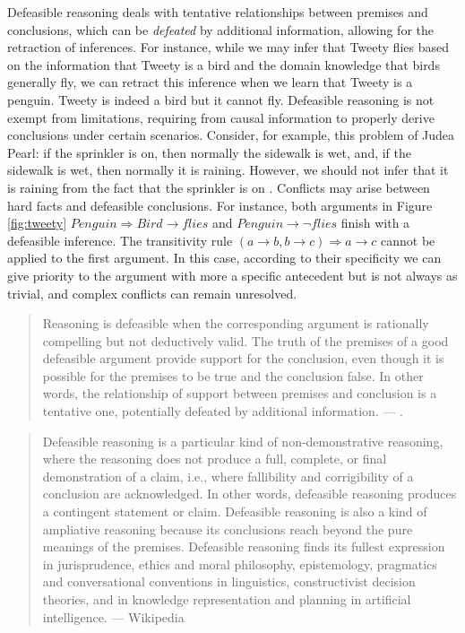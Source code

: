 \documentclass[
]{book}
\begin{document}
Defeasible reasoning deals with tentative relationships between premises and conclusions, which can be \emph{defeated} by additional information, allowing for the retraction of inferences. For instance, while we may infer that Tweety flies based on the information that Tweety is a bird and the domain knowledge that birds generally fly, we can retract this inference when we learn that Tweety is a penguin. Tweety is indeed a bird but it cannot fly. Defeasible reasoning is not exempt from limitations, requiring from causal information to properly derive conclusions under certain scenarios. Consider, for example, this problem of Judea Pearl: if the sprinkler is on, then normally the sidewalk is wet, and, if the sidewalk is wet, then normally it is raining. However, we should not infer that it is raining from the fact that the sprinkler is on \citep{pearl2014probabilistic}. Conflicts may arise between hard facts and defeasible conclusions. For instance, both arguments in Figure \ref{fig:tweety} \(Penguin ⇒ Bird → flies\) and \(Penguin → ¬flies\) finish with a defeasible inference. The transitivity rule \((a → b, b → c) ⇒ a → c\) cannot be applied to the first argument. In this case, according to their specificity we can give priority to the argument with more a specific antecedent but is not always as trivial, and complex conflicts can remain unresolved.

\begin{quote}
Reasoning is defeasible when the corresponding argument is rationally compelling but not deductively valid. The truth of the premises of a good defeasible argument provide support for the conclusion, even though it is possible for the premises to be true and the conclusion false. In other words, the relationship of support between premises and conclusion is a tentative one, potentially defeated by additional information. --- \citep{sep-reasoning-defeasible}.
\end{quote}

\begin{quote}
Defeasible reasoning is a particular kind of non-demonstrative reasoning, where the reasoning does not produce a full, complete, or final demonstration of a claim, i.e., where fallibility and corrigibility of a conclusion are acknowledged. In other words, defeasible reasoning produces a contingent statement or claim. Defeasible reasoning is also a kind of ampliative reasoning because its conclusions reach beyond the pure meanings of the premises. Defeasible reasoning finds its fullest expression in jurisprudence, ethics and moral philosophy, epistemology, pragmatics and conversational conventions in linguistics, constructivist decision theories, and in knowledge representation and planning in artificial intelligence. --- Wikipedia
\end{quote}
\end{document}
